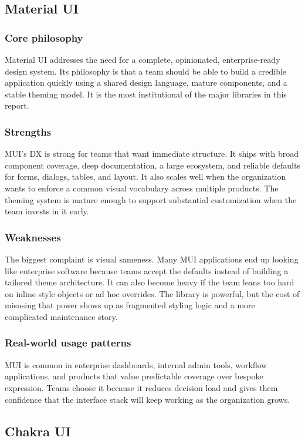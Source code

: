 \documentclass[11pt,twoside,a4paper]{article}
\begin{document}
\subsection{Material UI}
\subsubsection{Core philosophy}
Material UI addresses the need for a complete, opinionated, enterprise-ready design system. Its philosophy is that a team should be able to build a credible application quickly using a shared design language, mature components, and a stable theming model. It is the most institutional of the major libraries in this report.

\subsubsection{Strengths}
MUI's DX is strong for teams that want immediate structure. It ships with broad component coverage, deep documentation, a large ecosystem, and reliable defaults for forms, dialogs, tables, and layout. It also scales well when the organization wants to enforce a common visual vocabulary across multiple products. The theming system is mature enough to support substantial customization when the team invests in it early.

\subsubsection{Weaknesses}
The biggest complaint is visual sameness. Many MUI applications end up looking like enterprise software because teams accept the defaults instead of building a tailored theme architecture. It can also become heavy if the team leans too hard on inline style objects or ad hoc overrides. The library is powerful, but the cost of misusing that power shows up as fragmented styling logic and a more complicated maintenance story.

\subsubsection{Real-world usage patterns}
MUI is common in enterprise dashboards, internal admin tools, workflow applications, and products that value predictable coverage over bespoke expression. Teams choose it because it reduces decision load and gives them confidence that the interface stack will keep working as the organization grows.

\subsection{Chakra UI}
\end{document}
